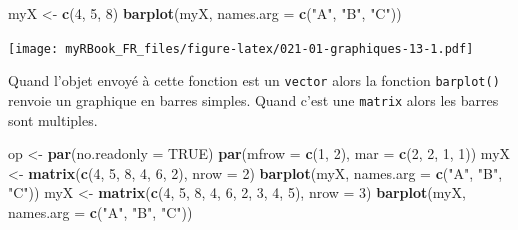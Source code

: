 \documentclass[]{book}
\newenvironment{Shaded}{\begin{snugshade}}{\end{snugshade}}
\newcommand{\DataTypeTok}[1]{\textcolor[rgb]{0.13,0.29,0.53}{#1}}
\newcommand{\DecValTok}[1]{\textcolor[rgb]{0.00,0.00,0.81}{#1}}
\newcommand{\KeywordTok}[1]{\textcolor[rgb]{0.13,0.29,0.53}{\textbf{#1}}}
\newcommand{\NormalTok}[1]{#1}
\newcommand{\OtherTok}[1]{\textcolor[rgb]{0.56,0.35,0.01}{#1}}
\newcommand{\StringTok}[1]{\textcolor[rgb]{0.31,0.60,0.02}{#1}}
\begin{document}
\begin{Shaded}
\begin{Highlighting}[]
\NormalTok{myX <-}\StringTok{ }\KeywordTok{c}\NormalTok{(}\DecValTok{4}\NormalTok{, }\DecValTok{5}\NormalTok{, }\DecValTok{8}\NormalTok{)}
\KeywordTok{barplot}\NormalTok{(myX, }\DataTypeTok{names.arg =} \KeywordTok{c}\NormalTok{(}\StringTok{"A"}\NormalTok{, }\StringTok{"B"}\NormalTok{, }\StringTok{"C"}\NormalTok{))}
\end{Highlighting}
\end{Shaded}

\texttt{[image: myRBook\_FR\_files/figure-latex/021-01-graphiques-13-1.pdf]}

Quand l'objet envoyé à cette fonction est un \texttt{vector} alors la fonction \texttt{barplot()} renvoie un graphique en barres simples. Quand c'est une \texttt{matrix} alors les barres sont multiples.

\begin{Shaded}
\begin{Highlighting}[]
\NormalTok{op <-}\StringTok{ }\KeywordTok{par}\NormalTok{(}\DataTypeTok{no.readonly =} \OtherTok{TRUE}\NormalTok{)}
\KeywordTok{par}\NormalTok{(}\DataTypeTok{mfrow =} \KeywordTok{c}\NormalTok{(}\DecValTok{1}\NormalTok{, }\DecValTok{2}\NormalTok{), }\DataTypeTok{mar =} \KeywordTok{c}\NormalTok{(}\DecValTok{2}\NormalTok{, }\DecValTok{2}\NormalTok{, }\DecValTok{1}\NormalTok{, }\DecValTok{1}\NormalTok{))}
\NormalTok{myX <-}\StringTok{ }\KeywordTok{matrix}\NormalTok{(}\KeywordTok{c}\NormalTok{(}\DecValTok{4}\NormalTok{, }\DecValTok{5}\NormalTok{, }\DecValTok{8}\NormalTok{, }\DecValTok{4}\NormalTok{, }\DecValTok{6}\NormalTok{, }\DecValTok{2}\NormalTok{), }\DataTypeTok{nrow =} \DecValTok{2}\NormalTok{)}
\KeywordTok{barplot}\NormalTok{(myX, }\DataTypeTok{names.arg =} \KeywordTok{c}\NormalTok{(}\StringTok{"A"}\NormalTok{, }\StringTok{"B"}\NormalTok{, }\StringTok{"C"}\NormalTok{))}
\NormalTok{myX <-}\StringTok{ }\KeywordTok{matrix}\NormalTok{(}\KeywordTok{c}\NormalTok{(}\DecValTok{4}\NormalTok{, }\DecValTok{5}\NormalTok{, }\DecValTok{8}\NormalTok{, }\DecValTok{4}\NormalTok{, }\DecValTok{6}\NormalTok{, }\DecValTok{2}\NormalTok{, }\DecValTok{3}\NormalTok{, }\DecValTok{4}\NormalTok{, }\DecValTok{5}\NormalTok{), }\DataTypeTok{nrow =} \DecValTok{3}\NormalTok{)}
\KeywordTok{barplot}\NormalTok{(myX, }\DataTypeTok{names.arg =} \KeywordTok{c}\NormalTok{(}\StringTok{"A"}\NormalTok{, }\StringTok{"B"}\NormalTok{, }\StringTok{"C"}\NormalTok{))}
\end{Highlighting}
\end{Shaded}
\end{document}
